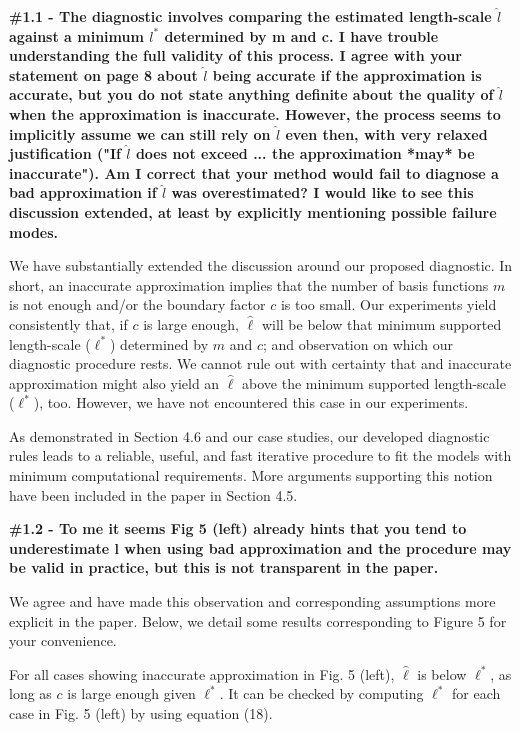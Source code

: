 \documentclass[11pt]{report}
\begin{document}
\textbf{\#1.1 - The diagnostic involves comparing the estimated length-scale $\hat l$ against a minimum $l^*$ determined by m and c. I have trouble understanding the full validity of this process. I agree with your statement on page 8 about $\hat l$ being accurate if the approximation is accurate, but you do not state anything definite about the quality of $\hat l$ when the approximation is inaccurate. However, the process seems to implicitly assume we can still rely on $\hat l$ even then, with very relaxed justification ("If $\hat l$ does not exceed ... the approximation *may* be inaccurate"). Am I correct that your method would fail to diagnose a bad approximation if $\hat l$ was overestimated? I would like to see this discussion extended, at least by explicitly mentioning possible failure modes.}

We have substantially extended the discussion around our proposed diagnostic. In short, an inaccurate approximation implies that the number of basis functions $m$ is not enough and/or the boundary factor $c$ is too small. Our experiments yield consistently that, if $c$ is large enough, $\hat{\ell}$ will be below that minimum supported length-scale ($\ell^*$) determined by $m$ and $c$; and observation on which our diagnostic procedure rests. We cannot rule out with certainty that and inaccurate approximation might also yield an $\hat{\ell}$ above the minimum supported length-scale ($\ell^*$), too. However, we have not encountered this case in our experiments.

As demonstrated in Section 4.6 and our case studies, our developed diagnostic rules leads to a reliable, useful, and fast iterative procedure to fit the models with minimum computational requirements. More arguments supporting this notion have been included in the paper in Section 4.5. 

\textbf{\#1.2 - To me it seems Fig 5 (left) already hints that you tend to underestimate l when using bad approximation and the procedure may be valid in practice, but this is not transparent in the paper.}

We agree and have made this observation and corresponding assumptions more explicit in the paper. Below, we detail some results corresponding to Figure 5 for your convenience.

For all cases showing inaccurate approximation in Fig. 5 (left), $\hat{\ell}$ is below $\ell^*$, as long as $c$ is large enough given $\ell^*$. It can be checked by computing $\ell^*$ for each case in Fig. 5 (left) by using equation (18). 
\end{document}
